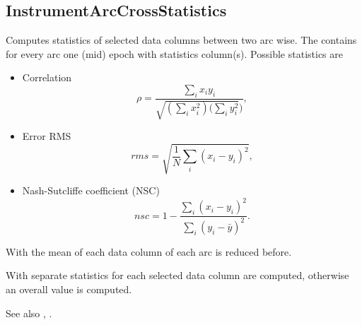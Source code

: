 \subsection{InstrumentArcCrossStatistics}\label{InstrumentArcCrossStatistics}
Computes statistics of selected data columns between two  arc wise.
The  contains for every arc one (mid) epoch
with statistics column(s). Possible statistics are
\begin{itemize}
  \item Correlation
  \begin{equation}
    \rho = \frac{\sum_i x_i y_i}{\sqrt{(\sum_i x_i^2) (\sum_i y_i^2})},
  \end{equation}
  \item Error RMS
  \begin{equation}
    rms = \sqrt{\frac{1}{N}\sum_i (x_i-y_i)^2},
  \end{equation}
  \item Nash-Sutcliffe coefficient (NSC)
  \begin{equation}
    nsc = 1- \frac{\sum_i (x_i-y_i)^2}{\sum_i (y_i-\bar{y})^2}.
  \end{equation}
\end{itemize}
With  the mean of each data column of each arc is reduced before.

With  separate statistics for each selected data column are computed,
otherwise an overall value is computed.

See also , .



